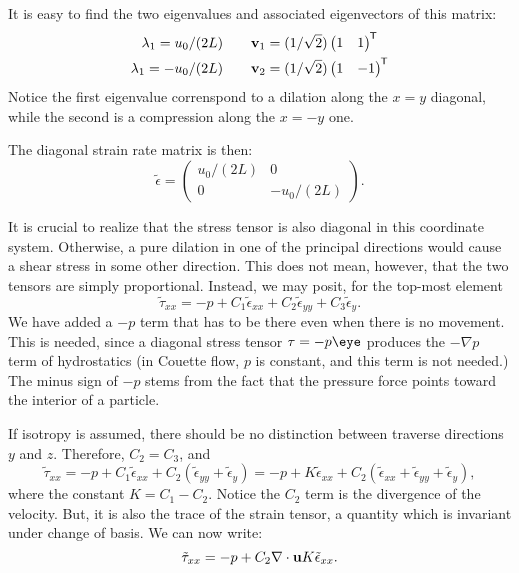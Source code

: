 It is easy to find the two eigenvalues and associated eigenvectors of
this matrix:
\begin{align*}
  \lambda_1=  u_0/(2L) \qquad &\mathbf{v}_1=(1/\sqrt{2}) \begin{pmatrix} 1 &  1 \end{pmatrix}^{\mkern-1.5mu\mathsf{T}} \\
  \lambda_1= -u_0/(2L) \qquad &\mathbf{v}_2=(1/\sqrt{2})  \begin{pmatrix} 1 &  -1 \end{pmatrix}^{\mkern-1.5mu\mathsf{T}} \\
\end{align*}
Notice the first eigenvalue correnspond to a dilation along the $x=y$
diagonal, while the second is a compression along the $x=-y$ one.

The diagonal strain rate matrix is then:
\[
\tilde{\epsilon}=
\begin{pmatrix}
  u_0/(2L)   & 0 \\
  0          & - u_0/(2L)
\end{pmatrix} .
\]

It is crucial to realize that the stress tensor is also diagonal in
this coordinate system. Otherwise, a pure dilation in one of the
principal directions would cause a shear stress in some other
direction. This does not mean, however, that the two tensors are
simply proportional. Instead, we may posit, for the top-most element
\[
\tilde{\tau}_{xx}=
- p + 
C_1 \tilde{\epsilon}_{xx} +
C_2 \tilde{\epsilon}_{yy} +
C_3 \tilde{\epsilon}_{y} .
\]
We have added a $-p$ term that has to be there even when there is no
movement. This is needed, since a diagonal stress tensor $\tau=-p\eye$
produces the $-\nabla p$ term of hydrostatics (in Couette flow, $p$ is
constant, and this term is not needed.) The minus sign of $-p$ stems
from the fact that the pressure force points toward the interior of a
particle.

If isotropy is assumed, there should be no distinction between
traverse directions $y$ and $z$. Therefore, $C_2=C_3$, and
\[
\tilde{\tau}_{xx}=
- p + 
C_1 \tilde{\epsilon}_{xx} +
C_2 ( \tilde{\epsilon}_{yy} +  \tilde{\epsilon}_{y}  ) =
- p + 
K \tilde{\epsilon}_{xx} +
C_2 ( \tilde{\epsilon}_{xx} + \tilde{\epsilon}_{yy} +  \tilde{\epsilon}_{y}  ) ,
\]
where the constant $K=C_1-C_2$. Notice the $C_2$ term is the
divergence of the velocity. But, it is also the trace of the strain
tensor, a quantity which is invariant under change of basis. We can
now write:
\[
\tilde{\tau}_{xx}=
- p + C_2 \nabla\cdot \mathbf{u} 
K \tilde{\epsilon}_{xx} .
\]

